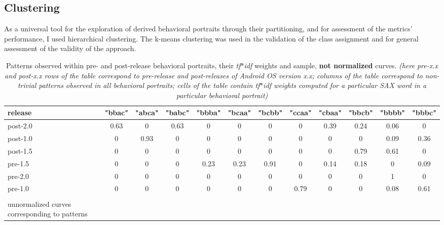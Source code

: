 \documentclass[conference]{IEEEtran}
\begin{document}
\subsection{Clustering} \label{clustering}
As a universal tool for the exploration of derived behavioral portraits through their partitioning, 
and for assessment of the metrics' performance, I used hierarchical clustering. The k-means
clustering was used in the validation of the class assignment and for general assessment of 
the validity of the approach.

\begin{table}
  \caption{Patterns observed within pre- and post-release behavioral portraits, their \textit{tf$\ast$idf} weights and sample, \textbf{not normalized} curves.
  \textit{(here pre-\textit{x.x} and post-\textit{x.x} rows of the table correspond to pre-release and post-releases of Android OS version x.x; 
   columns of the table correspond to non-trivial patterns observed in all behavioral portraits; cells of the table contain \textit{tf$\ast$idf} 
   weights computed for a particular SAX word in a particular behavioral portrait)}}
  \label{tab:tokens}
  \begin{tabular}{ | b{1.5cm} | c | c | c | c | c | c | c | c | c | c | c |}
  \hline
release & "bbac" & "abca" & "babc" & "bbba" & "bcaa" & "bcbb" & "ccaa" & "cbaa" & "bbcb" & "bbbb" & "bbbc"\\ 
  \hline
 post-2.0 & 0.63 & 0 & 0.63 & 0 & 0 & 0 & 0 & 0.39 & 0.24 & 0.06 & 0\\ 
 post-1.0 & 0 & 0.93 & 0 & 0 & 0 & 0 & 0 & 0 & 0 & 0.09 & 0.36\\ 
 post-1.5 & 0 & 0 & 0 & 0 & 0 & 0 & 0 & 0 & 0.79 & 0.61 & 0\\ 
 pre-1.5 & 0 & 0 & 0 & 0.23 & 0.23 & 0.91 & 0 & 0.14 & 0.18 & 0 & 0.09\\ 
 pre-2.0 & 0 & 0 & 0 & 0 & 0 & 0 & 0 & 0 & 0 & 1 & 0\\ 
 pre-1.0 & 0 & 0 & 0 & 0 & 0 & 0 & 0.79 & 0 & 0 & 0.08 & 0.61\\
 \hline 
 &  &  &  &  &  &  & &  &  &  & \\
 unnormalized curves corresponding to patterns &

\end{tabular}
\end{table}
\end{document}
